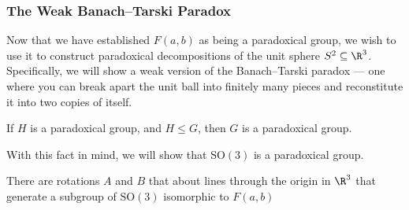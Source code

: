 \documentclass[10pt]{mypackage2}
\begin{document}
\subsubsection{The Weak Banach--Tarski Paradox}%
Now that we have established $F(a,b)$ as being a paradoxical group, we wish to use it to construct paradoxical decompositions of the unit sphere $S^2\subseteq \R^3$. Specifically, we will show a weak version of the Banach--Tarski paradox --- one where you can break apart the unit ball into finitely many pieces and reconstitute it into two copies of itself.
\begin{fact}
  If $H$ is a paradoxical group, and $H\leq G$, then $G$ is a paradoxical group.
\end{fact}
With this fact in mind, we will show that $\text{SO}(3)$ is a paradoxical group.
\begin{theorem}
  There are rotations $A$ and $B$ that about lines through the origin in $\R^3$ that generate a subgroup of $\text{SO}(3)$ isomorphic to $F(a,b)$
\end{theorem}
\end{document}
